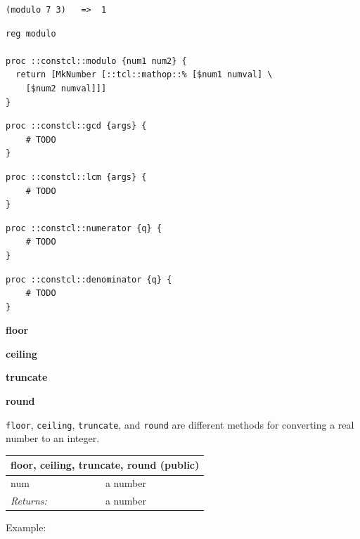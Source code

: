 \documentclass[twoside,9pt]{report}
\begin{document}
\noindent\makebox[\linewidth]{\rule{\linewidth}{0.4pt}}
\begin{lstlisting}
(modulo 7 3)   =>  1
\end{lstlisting}
\noindent\makebox[\linewidth]{\rule{\linewidth}{0.4pt}}
\noindent\makebox[\linewidth]{\rule{\linewidth}{0.4pt}}
\begin{lstlisting}
reg modulo
 
proc ::constcl::modulo {num1 num2} {
  return [MkNumber [::tcl::mathop::% [$num1 numval] \
    [$num2 numval]]]
}
\end{lstlisting}
\noindent\makebox[\linewidth]{\rule{\linewidth}{0.4pt}}
\noindent\makebox[\linewidth]{\rule{\linewidth}{0.4pt}}
\begin{lstlisting}
proc ::constcl::gcd {args} {
    # TODO
}
\end{lstlisting}
\noindent\makebox[\linewidth]{\rule{\linewidth}{0.4pt}}
\noindent\makebox[\linewidth]{\rule{\linewidth}{0.4pt}}
\begin{lstlisting}
proc ::constcl::lcm {args} {
    # TODO
}
\end{lstlisting}
\noindent\makebox[\linewidth]{\rule{\linewidth}{0.4pt}}
\noindent\makebox[\linewidth]{\rule{\linewidth}{0.4pt}}
\begin{lstlisting}
proc ::constcl::numerator {q} {
    # TODO
}
\end{lstlisting}
\noindent\makebox[\linewidth]{\rule{\linewidth}{0.4pt}}
\noindent\makebox[\linewidth]{\rule{\linewidth}{0.4pt}}
\begin{lstlisting}
proc ::constcl::denominator {q} {
    # TODO
}
\end{lstlisting}
\noindent\makebox[\linewidth]{\rule{\linewidth}{0.4pt}}

\textbf{floor}


\textbf{ceiling}


\textbf{truncate}


\textbf{round}


\texttt{floor}, \texttt{ceiling}, \texttt{truncate}, and \texttt{round} are different methods for converting a real number to an integer.

\begin{tabular}{ |l l| }
\hline
\multicolumn{2}{|l|}{floor, ceiling, truncate, round (public)} \\
\hline
num & a number \\
\textit{Returns:} & a number \\
\hline
\end{tabular}


Example:
\end{document}

